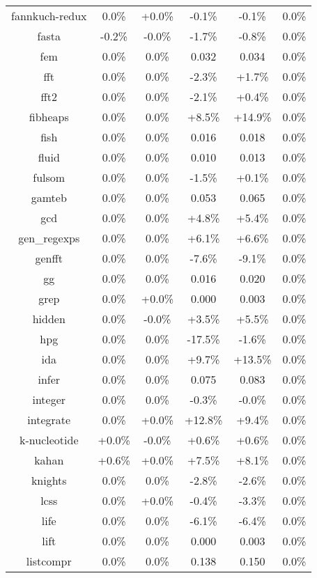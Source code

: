 \begin{tabular}{ c c c c c c }
fannkuch-redux &  0.0\% & +0.0\% & -0.1\% & -0.1\% &  0.0\%\\
fasta & -0.2\% & -0.0\% & -1.7\% & -0.8\% &  0.0\%\\
fem &  0.0\% &  0.0\% & 0.032 & 0.034 &  0.0\%\\
fft &  0.0\% &  0.0\% & -2.3\% & +1.7\% &  0.0\%\\
fft2 &  0.0\% &  0.0\% & -2.1\% & +0.4\% &  0.0\%\\
fibheaps &  0.0\% &  0.0\% & +8.5\% & +14.9\% &  0.0\%\\
fish &  0.0\% &  0.0\% & 0.016 & 0.018 &  0.0\%\\
fluid &  0.0\% &  0.0\% & 0.010 & 0.013 &  0.0\%\\
fulsom &  0.0\% &  0.0\% & -1.5\% & +0.1\% &  0.0\%\\
gamteb &  0.0\% &  0.0\% & 0.053 & 0.065 &  0.0\%\\
gcd &  0.0\% &  0.0\% & +4.8\% & +5.4\% &  0.0\%\\
gen\_regexps &  0.0\% &  0.0\% & +6.1\% & +6.6\% &  0.0\%\\
genfft &  0.0\% &  0.0\% & -7.6\% & -9.1\% &  0.0\%\\
gg &  0.0\% &  0.0\% & 0.016 & 0.020 &  0.0\%\\
grep &  0.0\% & +0.0\% & 0.000 & 0.003 &  0.0\%\\
hidden &  0.0\% & -0.0\% & +3.5\% & +5.5\% &  0.0\%\\
hpg &  0.0\% &  0.0\% & -17.5\% & -1.6\% &  0.0\%\\
ida &  0.0\% &  0.0\% & +9.7\% & +13.5\% &  0.0\%\\
infer &  0.0\% &  0.0\% & 0.075 & 0.083 &  0.0\%\\
integer &  0.0\% &  0.0\% & -0.3\% & -0.0\% &  0.0\%\\
integrate &  0.0\% & +0.0\% & +12.8\% & +9.4\% &  0.0\%\\
k-nucleotide & +0.0\% & -0.0\% & +0.6\% & +0.6\% &  0.0\%\\
kahan & +0.6\% & +0.0\% & +7.5\% & +8.1\% &  0.0\%\\
knights &  0.0\% &  0.0\% & -2.8\% & -2.6\% &  0.0\%\\
lcss &  0.0\% & +0.0\% & -0.4\% & -3.3\% &  0.0\%\\
life &  0.0\% &  0.0\% & -6.1\% & -6.4\% &  0.0\%\\
lift &  0.0\% &  0.0\% & 0.000 & 0.003 &  0.0\%\\
listcompr &  0.0\% &  0.0\% & 0.138 & 0.150 &  0.0\%\\

\end{tabular}
